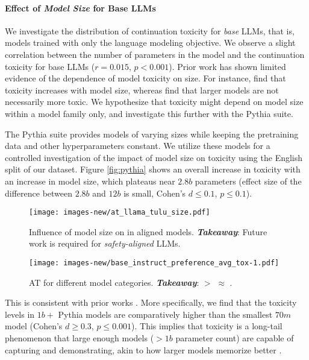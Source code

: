 \paragraph{Effect of \textit{Model Size} for Base LLMs}
We investigate the distribution of continuation toxicity for \textit{base} LLMs, that is, models trained with only the language modeling objective. We observe a slight correlation between the number of parameters in the model and the continuation toxicity for base LLMs ($r=0.015$, $p<0.001$).
Prior work has shown limited evidence of the dependence of model toxicity on size. For instance, \citet{touvron2023llama, touvron2023llama2} find that toxicity increases with model size, whereas 
\citet{gehman-etal-2020-realtoxicityprompts, NEURIPS2022_c1e2faff} find that larger models are not necessarily more toxic. We hypothesize that toxicity might depend on model size within a model family only, and investigate this further with the Pythia suite.

The Pythia suite provides models of varying sizes while keeping the pretraining data and other hyperparameters constant. We utilize these models for a controlled investigation of the impact of model size on toxicity using the English split of our dataset. Figure \ref{fig:pythia} shows an overall increase in toxicity with an increase in model size, which plateaus near $2.8b$ parameters (effect size of the difference between $2.8b$ and $12b$ is small, Cohen's $d\leq 0.1$, $p \leq 0.1$).

\begin{wrapfigure}[27]{r}{4cm}
    \centering
    \vspace{-20pt}
    \texttt{[image: images-new/at\_llama\_tulu\_size.pdf]}
    \vspace{-10pt}
    \caption{Influence of model size on \avgTox in aligned models. \textbf{\textit{Takeaway}}: Future work is required for \textit{safety-aligned} LLMs.}
    \label{fig:align_size}

    \vspace{10pt}
    
    \texttt{[image: images-new/base\_instruct\_preference\_avg\_tox-1.pdf]}
    \caption{\textsc{AT} for different model categories. \textbf{\textit{Takeaway}}: \baseModel $>$ \instructModel $\approx$ \prefModel.}
    \label{fig:rq_model_type_tox}
    
\end{wrapfigure}

This is consistent with prior works \citep{touvron2023llama, touvron2023llama2}. More specifically, we find that the toxicity levels in $1b+$ Pythia models are comparatively higher than the smallest $70m$ model (Cohen's $d\geq 0.3$, $p \leq 0.001$).
This implies that toxicity is a long-tail phenomenon that large enough models ($> 1b$ parameter count) are capable of capturing and demonstrating, akin to how larger models memorize better \citep{tirumala2022memorization}.

